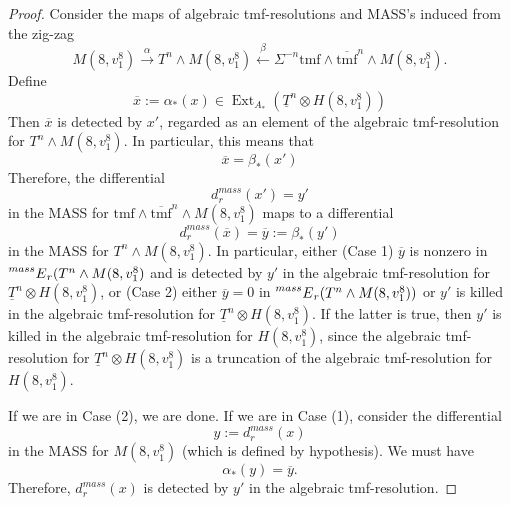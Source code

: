 \documentclass[10pt]{amsart}
\newcommand{\ul}[1]{\underline{#1}}
\newcommand{\br}[1]{\overline{#1}}
\newcommand{\tmf}{\mathrm{tmf}}
\theoremstyle{definition}
\numberwithin{equation}{section}
\numberwithin{figure}{section}
\DeclareMathOperator{\Ext}{Ext}
\newcommand{\E}[2]{\prescript{#1}{#2}{E}}
\begin{document}
\begin{proof}
Consider the maps of algebraic tmf-resolutions and MASS's induced from the zig-zag
$$ M(8,v_1^8) \xrightarrow{\alpha} T^n \wedge M(8,v_1^8) \xleftarrow{\beta} \Sigma^{-n} \tmf \wedge \br{\tmf}^n \wedge M(8,v_1^8). $$
Define
$$ \br{x} := \alpha_*(x) \in \Ext_{A_*}(\ul{T}^n \otimes H(8,v_1^8))$$ 
Then $\br{x}$ is detected by $x'$, regarded as an element of the algebraic tmf-resolution for $T^n \wedge M(8,v_1^8)$.  In particular, this means that 
$$ \br{x} = \beta_*(x') $$ 
Therefore, the differential
$$ d_r^{mass}(x') = y' $$
in the MASS for $\tmf \wedge \br{\tmf}^n \wedge M(8,v_1^8)$ maps to a differential
$$ d_r^{mass}(\br{x}) = \br{y} := \beta_*(y') $$
in the MASS for $T^n \wedge M(8,v_1^8)$.  In particular, either (Case 1) $\br{y}$ is nonzero in $\E{mass}{}_r(T^n \wedge M(8,v_1^8)$ and is detected by $y'$ in the algebraic tmf-resolution for $\ul{T}^n \otimes H(8,v_1^8)$, or (Case 2) either $\br{y} = 0$ in $\E{mass}{}_r(T^n \wedge M(8,v_1^8))$ or $y'$ is killed in the algebraic tmf-resolution for $\ul{T}^n \otimes H(8,v_1^8)$.   If the latter is true, then $y'$ is killed in the algebraic tmf-resolution for $H(8,v_1^8)$, since the algebraic tmf-resolution for $\ul{T}^n \otimes H(8,v_1^8)$ is a truncation of the algebraic tmf-resolution for $H(8,v_1^8)$.

If we are in Case (2), we are done.  If we are in Case (1), consider the differential
$$ y := d^{mass}_r(x) $$
in the MASS for $M(8,v_1^8)$ (which is defined by hypothesis).  
We must have 
$$ \alpha_*(y) = \br{y}. $$
Therefore, $d_r^{mass}(x)$ is detected by $y'$ in the algebraic tmf-resolution.
\end{proof}
\end{document}
